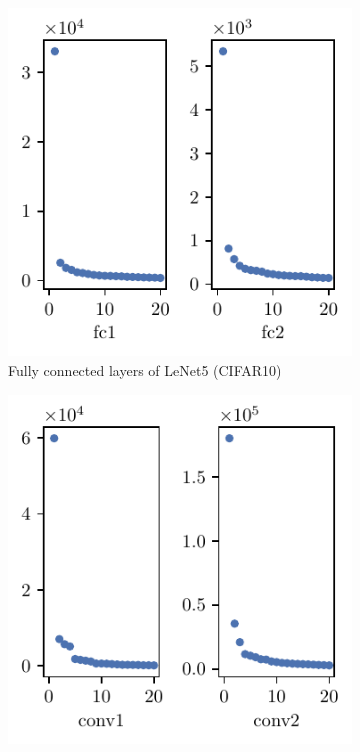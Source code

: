 \begin{figure}[th]
\begin{subfigure}[b]{0.32\textwidth}
        \includegraphics[width=\textwidth]{Figures/Eigenspectrum/xxT/xxT_sigval_d20_CIFAR10_Exp1_LeNet5_fixlr0.01R1_E-1_fc1fc2.pdf}
        \caption{Fully connected layers of LeNet5 (CIFAR10)}
        \label{fig:xxT_sig_lenet}
    \end{subfigure}
    \hfill
    \begin{subfigure}[b]{0.32\textwidth}
        \centering
        \captionsetup{justification=centering}
        \includegraphics[width=\textwidth]{Figures/Eigenspectrum/xxT/xxTConv_sigval_d20_CIFAR10_Exp1_LeNet5_fixlr0.01_E-1.pdf}

\end{subfigure}
\end{figure}
